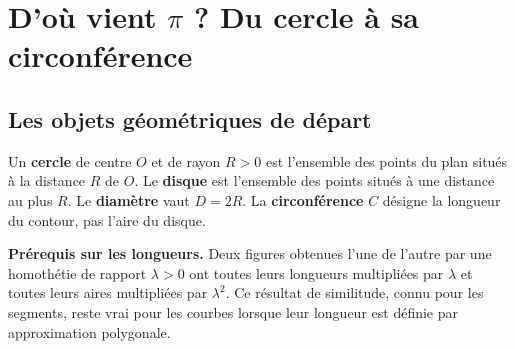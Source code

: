 \documentclass[../cours_spe_trigo.tex]{subfiles}
\begin{document}
\setcounter{chapter}{0}
\chapter{D'où vient \texorpdfstring{$\pi$}{pi} ? Du cercle à sa circonférence}
\section{Les objets géométriques de départ}
\begin{definition}
Un \textbf{cercle} de centre $O$ et de rayon $R>0$ est l'ensemble des points du plan situés à la distance $R$ de $O$. Le \textbf{disque} est l'ensemble des points situés à une distance au plus $R$. Le \textbf{diamètre} vaut $D=2R$. La \textbf{circonférence} $C$ désigne la longueur du contour, pas l'aire du disque.
\end{definition}
\begin{center}
\end{center}
\textbf{Prérequis sur les longueurs.} Deux figures obtenues l'une de l'autre par une homothétie de rapport $\lambda>0$ ont toutes leurs longueurs multipliées par $\lambda$ et toutes leurs aires multipliées par $\lambda^2$. Ce résultat de similitude, connu pour les segments, reste vrai pour les courbes lorsque leur longueur est définie par approximation polygonale.
\end{document}
